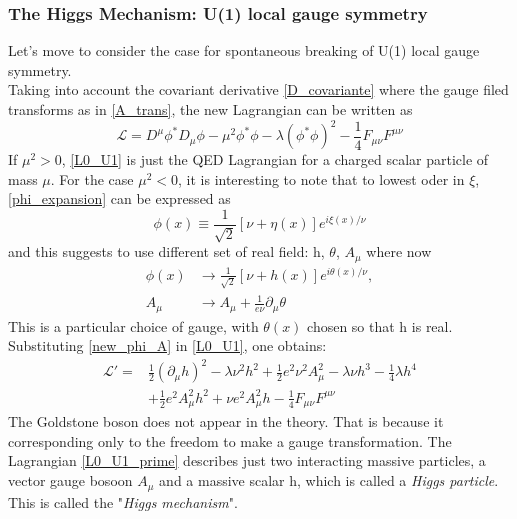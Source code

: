 \subsubsection{The Higgs Mechanism: U(1) local gauge symmetry}
Let's move to consider the case for spontaneous breaking of U(1) local gauge symmetry.\\
Taking into account the covariant derivative \ref{D_covariante} where the gauge filed transforms as in \ref{A_trans}, the new Lagrangian can be written as
\begin{equation}
\mathcal{L} = D^{\mu}\phi^{*}D_{\mu}\phi -\mu^{2}\phi^{*}\phi-\lambda(\phi^{*}\phi)^{2}-\frac{1}{4}F_{\mu\nu}F^{\mu\nu}
\label{L0_U1}
\end{equation}
If $\mu^{2} > 0$, \ref{L0_U1} is just the QED Lagrangian for a charged scalar particle of mass $\mu$.
For the case $\mu^{2} < 0$, it is interesting to note that to lowest oder in $\xi$, \ref{phi_expansion} can be expressed as
\begin{equation}
\phi(x) \equiv \frac{1}{\sqrt{2}}[\nu+\eta(x)]e^{i\xi(x)/\nu}
\label{phi_expansion_2}
\end{equation}
and this suggests to use different set of real field: h, $\theta$, $A_{\mu}$ where now
\begin{equation}
\begin{split}
\phi(x) &\to \frac{1}{\sqrt{2}}[\nu+h(x)]e^{i\theta(x)/\nu}, \\
A_{\mu} &\to A_{\mu}+ \frac{1}{e\nu}\partial_{\mu}\theta
\end{split}
\label{new_phi_A}
\end{equation}
This is a particular choice of gauge, with $\theta(x)$ chosen so that h is real. Substituting \ref{new_phi_A} in \ref{L0_U1}, one obtains:
\begin{equation}
\begin{split}
\mathcal{L}' = &\frac{1}{2}(\partial_{\mu}h)^{2}-\lambda\nu^{2}h^{2}+\frac{1}{2}e^{2}\nu^{2}A_{\mu}^{2}-\lambda\nu h^{3}-\frac{1}{4}\lambda h^{4}\\
&+\frac{1}{2}e^{2}A_{\mu}^{2}h^{2}+\nu e^{2}A_{\mu}^{2}h-\frac{1}{4}F_{\mu\nu}F^{\mu\nu}
\end{split}
\label{L0_U1_prime}
\end{equation}
The Goldstone boson does not appear in the theory. That is because it corresponding only to the freedom to make a gauge transformation. The Lagrangian \ref{L0_U1_prime} describes just two interacting massive particles, a vector gauge bosoon $A_{\mu}$ and a massive scalar h, which is called a \textit{Higgs particle}. This is called the "\textit{Higgs mechanism}".\\
